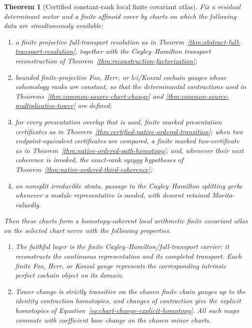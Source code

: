 \documentclass[11pt]{article}
\newtheorem{theorem}{Theorem}[section]
\theoremstyle{definition}
\begin{document}
\begin{theorem}[Certified constant-rank local finite covariant atlas]\label{thm:certified-local-finite-atlas}
Fix a residual determinant sector and a finite affinoid cover by charts on which
the following data are simultaneously available:
\begin{enumerate}[label=\textnormal{(\alph*)}]
\item a finite projective full-transport resolution as in
Theorem~\ref{thm:abstract-full-transport-resolution}, together with the
Cayley--Hamilton transport reconstruction of
Theorem~\ref{thm:reconstruction-factorization};
\item bounded finite-projective Fox, Herr, or lci/Koszul
cochain gauges whose cohomology ranks are constant, so that the determinantal
contractions used in Theorems~\ref{thm:common-source-chart-change} and
\ref{thm:common-source-multiplicative-tower} are defined;
\item for every presentation overlap that is used, finite marked presentation
certificates as in Theorem~\ref{thm:certified-native-ordered-transition}; when
two endpoint-equivalent certificates are compared, a finite marked
two-certificate as in Theorem~\ref{thm:native-ordered-path-homotopy}; and,
whenever their next coherence is invoked, the exact-rank syzygy hypotheses of
Theorem~\ref{thm:native-ordered-third-coherence};
\item on nonsplit irreducible strata, passage to the Cayley--Hamilton splitting
gerbe whenever a module representative is needed, with descent retained
Morita-valuedly.
\end{enumerate}
Then these charts form a homotopy-coherent local arithmetic finite covariant atlas
on the selected chart nerve with the following properties.
\begin{enumerate}[label=\textnormal{(\roman*)}]
\item The faithful layer is the finite Cayley--Hamilton/full-transport carrier:
it reconstructs the continuous representation and its completed transport.
Each finite Fox, Herr, or Koszul gauge represents the
corresponding intrinsic perfect cochain object on its domain.

\item Tower change is strictly transitive on the chosen finite chain gauges up
to the identity contraction homotopies, and changes of contraction give the
explicit homotopies of Equation~\eqref{eq:chart-change-explicit-homotopy}.
All such maps commute with coefficient base change on the chosen minor charts.


\end{enumerate}
\end{theorem}
\end{document}
